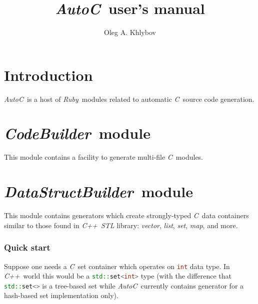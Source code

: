 \documentclass[a4paper]{article}
\newcommand{\autoc}{\emph{AutoC}}
\newcommand{\R}{\emph{Ruby}}
\newcommand{\C}{\emph{C}}
\newcommand{\Cpp}{\emph{C++}}
\begin{document}
\title{\autoc\ user's manual}
\author{Oleg A. Khlybov}


\maketitle


\tableofcontents


\newpage


\part{Introduction}


\autoc\ is a host of \R\ modules related to automatic \C\ source code generation.


\newcommand{\codebuilder}{\emph{CodeBuilder}}
\part{\codebuilder\ module}


This module contains a facility to generate multi-file \C\ modules.


\newcommand{\datastructbuilder}{\emph{DataStructBuilder}}
\part{\datastructbuilder\ module}


This module contains generators which create strongly-typed \C\ data containers similar to those found in \Cpp\ \emph{STL} library: \emph{vector}, \emph{list}, \emph{set}, \emph{map}, and more.


\section{Quick start}


Suppose one needs a \C\ set container which operates on \lstinline[language=C++]{int} data type.
In \Cpp\ world this would be a \lstinline[language=C++]{std::set<int>} type (with the difference that \lstinline[language=C++]{std::set<>} is a tree-based set while \autoc\ currently contains generator for a hash-based set implementation only).
\end{document}
